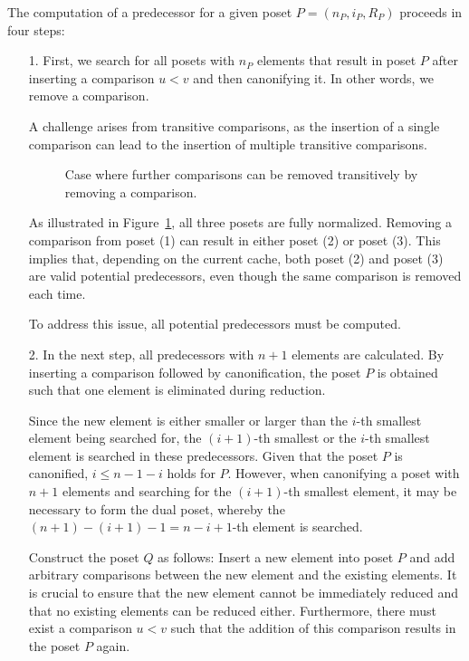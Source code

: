 \documentclass[twoside,leqno,twocolumn]{article}
\begin{document}
The computation of a predecessor for a given poset $P = (n_P, i_P, R_P)$ proceeds in four steps:
\begin{itemize}
  \item[1.]
    First, we search for all posets with $n_P$ elements that result in poset $P$ after inserting a comparison $u < v$ and then canonifying it.
    In other words, we remove a comparison.

    A challenge arises from transitive comparisons, as the insertion of a single comparison can lead to the insertion of multiple transitive comparisons.

    \begin{figure}[!b]
      \centering
      
      \caption{Case where further comparisons can be removed transitively by removing a comparison.}
      \label{fig:backward_problematic}
    \end{figure}

    As illustrated in Figure~\ref{fig:backward_problematic}, all three posets are fully normalized.
    Removing a comparison from poset (1) can result in either poset (2) or poset (3).
    This implies that, depending on the current cache, both poset (2) and poset (3) are valid potential predecessors, even though the same comparison is removed each time.

    To address this issue, all potential predecessors must be computed.

  \item[2.]
    In the next step, all predecessors with $n + 1$ elements are calculated.
    By inserting a comparison followed by canonification, the poset $P$ is obtained such that one element is eliminated during reduction.

    Since the new element is either smaller or larger than the $i$-th smallest element being searched for, the $(i + 1)$-th smallest or the $i$-th smallest element is searched in these predecessors.
    Given that the poset $P$ is canonified, $i \leq n - 1 - i$ holds for $P$.
    However, when canonifying a poset with $n + 1$ elements and searching for the $(i + 1)$-th smallest element, it may be necessary to form the dual poset, whereby the $(n + 1) - (i + 1) - 1 = n - i + 1$-th element is searched.

    Construct the poset $Q$ as follows:
    Insert a new element into poset $P$ and add arbitrary comparisons between the new element and the existing elements.
    It is crucial to ensure that the new element cannot be immediately reduced and that no existing elements can be reduced either.
    Furthermore, there must exist a comparison $u < v$ such that the addition of this comparison results in the poset $P$ again.



\end{itemize}
\end{document}
